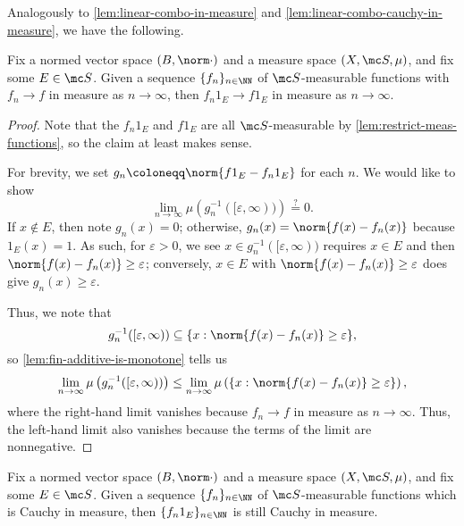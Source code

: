 \documentclass[../notes.tex]{subfiles}
\begin{document}
Analogously to \autoref{lem:linear-combo-in-measure} and \autoref{lem:linear-combo-cauchy-in-measure}, we have the following.
\begin{lemma}
	Fix a normed vector space $(B,\norm\cdot)$ and a measure space $(X,\mc S,\mu)$, and fix some $E\in\mc S$. Given a sequence $\{f_n\}_{n\in\NN}$ of $\mc S$-measurable functions with $f_n\to f$ in measure as $n\to\infty$, then $f_n1_E\to f1_E$ in measure as $n\to\infty$.
\end{lemma}
\begin{proof}
	Note that the $f_n1_E$ and $f1_E$ are all $\mc S$-measurable by \autoref{lem:restrict-meas-functions}, so the claim at least makes sense.

	For brevity, we set $g_n\coloneqq\norm{f1_E-f_n1_E}$ for each $n$. We would like to show
	\[\lim_{n\to\infty}\mu\left(g_n^{-1}([\varepsilon,\infty))\right)\stackrel?=0.\]
	If $x\notin E$, then note $g_n(x)=0$; otherwise, $g_n(x)=\norm{f(x)-f_n(x)}$ because $1_E(x)=1$. As such, for $\varepsilon>0$, we see $x\in g_n^{-1}([\varepsilon,\infty))$ requires $x\in E$ and then $\norm{f(x)-f_n(x)}\ge\varepsilon$; conversely, $x\in E$ with $\norm{f(x)-f_n(x)}\ge\varepsilon$ does give $g_n(x)\ge\varepsilon$.

	Thus, we note that
	\[g_n^{-1}([\varepsilon,\infty))\subseteq\{x:\norm{f(x)-f_n(x)}\ge\varepsilon\},\]
	so \autoref{lem:fin-additive-is-monotone} tells us
	\[\lim_{n\to\infty}\mu\left(g_n^{-1}([\varepsilon,\infty))\right)\le\lim_{n\to\infty}\mu\left(\{x:\norm{f(x)-f_n(x)}\ge\varepsilon\}\right),\]
	where the right-hand limit vanishes because $f_n\to f$ in measure as $n\to\infty$. Thus, the left-hand limit also vanishes because the terms of the limit are nonnegative.
\end{proof}
\begin{lemma}
	Fix a normed vector space $(B,\norm\cdot)$ and a measure space $(X,\mc S,\mu)$, and fix some $E\in\mc S$. Given a sequence $\{f_n\}_{n\in\NN}$ of $\mc S$-measurable functions which is Cauchy in measure, then $\{f_n1_E\}_{n\in\NN}$ is still Cauchy in measure.
\end{lemma}
\end{document}
